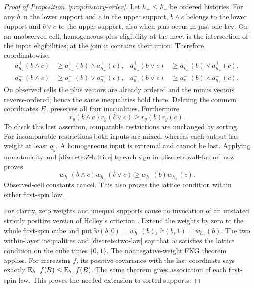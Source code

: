 \begin{proof}[Proof of Proposition~\ref{prop:history-order}]
Let $h_-\le h_+$ be ordered histories. For any $b$ in the lower support and
$c$ in the upper support, $b\wedge c$ belongs to the lower support and
$b\vee c$ to the upper support, also when pins occur in just one law.
On an unobserved cell, homogeneous-plus eligibility at the meet is the
intersection of the input eligibilities; at the join it contains their
union. Therefore, coordinatewise,
\begin{align*}
 a_{h_-}^+(b\wedge c)&\ge a_{h_-}^+(b)\wedge a_{h_+}^+(c),&
 a_{h_+}^+(b\vee c)&\ge a_{h_-}^+(b)\vee a_{h_+}^+(c),\\
 a_{h_-}^-(b\wedge c)&\ge a_{h_-}^-(b)\vee a_{h_+}^-(c),&
 a_{h_+}^-(b\vee c)&\ge a_{h_-}^-(b)\wedge a_{h_+}^-(c).
\end{align*}
On observed cells the plus vectors are already ordered and the minus
vectors reverse-ordered; hence the same inequalities hold there. Deleting
the common coordinates $E_0$ preserves all four inequalities.
Furthermore
\[
 r_y(b\wedge c)r_y(b\vee c)\ge r_y(b)r_y(c).
\]
To check this last assertion, comparable restrictions are unchanged by
sorting. For incomparable restrictions both inputs are mixed, whereas
each output has weight at least $q_y$. A homogeneous input is extremal
and cannot be lost. Applying monotonicity and
\eqref{discrete:Z-lattice} to each sign in
\eqref{discrete:wall-factor} now proves
\begin{equation}\label{discrete:two-law}
 w_{h_-}(b\wedge c)w_{h_+}(b\vee c)
       \ge w_{h_-}(b)w_{h_+}(c).
\end{equation}
Observed-cell constants cancel. This also proves the lattice condition
within either first-spin law.

For clarity, zero weights and unequal supports cause no invocation of an
unstated strictly positive version of Holley's criterion
\cite{Holley1974}. Extend the weights by zero to the whole first-spin cube
and put $\widetilde w(b,0)=w_{h_-}(b)$,
$\widetilde w(b,1)=w_{h_+}(b)$. The two within-layer inequalities and
\eqref{discrete:two-law} say that $\widetilde w$ satisfies the lattice
condition on the cube times $\{0,1\}$. The nonnegative-weight FKG theorem
\cite{FKG1971} applies. For increasing $f$, its positive covariance with
the last coordinate says exactly
$\mathbb E_{h_-}f(B)\le\mathbb E_{h_+}f(B)$. The same theorem gives association of
each first-spin law. This proves the needed extension to sorted supports.


\end{proof}
